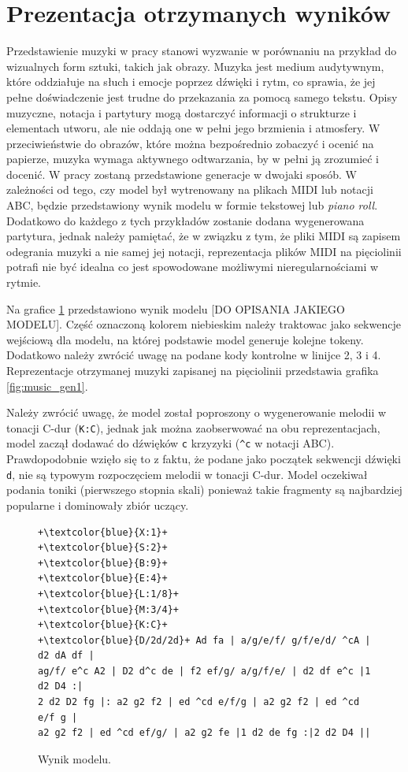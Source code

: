 \documentclass[data-science]{agh-wi} %
\begin{document}
\section{Prezentacja otrzymanych wyników}
Przedstawienie muzyki w pracy stanowi wyzwanie w porównaniu na przykład do wizualnych form sztuki, takich jak obrazy. Muzyka jest medium audytywnym, które oddziałuje na słuch i emocje poprzez dźwięki i rytm, co sprawia, że jej pełne doświadczenie jest trudne do przekazania za pomocą samego tekstu. Opisy muzyczne, notacja i partytury mogą dostarczyć informacji o strukturze i elementach utworu, ale nie oddają one w pełni jego brzmienia i atmosfery. W przeciwieństwie do obrazów, które można bezpośrednio zobaczyć i ocenić na papierze, muzyka wymaga aktywnego odtwarzania, by w pełni ją zrozumieć i docenić. W pracy zostaną przedstawione generacje w dwojaki sposób. W zależności od tego, czy model był wytrenowany na plikach MIDI lub notacji ABC, będzie przedstawiony wynik modelu w formie tekstowej lub \textit{piano roll}. Dodatkowo do każdego z tych przykładów zostanie dodana wygenerowana partytura, jednak należy pamiętać, że w związku z tym, że pliki MIDI są zapisem odegrania muzyki a nie samej jej notacji, reprezentacja plików MIDI na pięciolinii potrafi nie być idealna co jest spowodowane możliwymi nieregularnościami w rytmie.

Na grafice \ref*{code:music_gen1} przedstawiono wynik modelu [DO OPISANIA JAKIEGO MODELU]. Część oznaczoną kolorem niebieskim należy traktowac jako sekwencje wejściową dla modelu, na której podstawie model generuje kolejne tokeny. Dodatkowo należy zwrócić uwagę na podane kody kontrolne w linijce 2, 3 i 4. Reprezentacje otrzymanej muzyki zapisanej na pięciolinii przedstawia grafika \ref*{fig:music_gen1}.

Należy zwrócić uwagę, że model został poproszony o wygenerowanie melodii w tonacji C-dur (\texttt{K:C}), jednak jak można zaobserwować na obu reprezentacjach, model zaczął dodawać do dźwięków \texttt{c} krzyzyki (\texttt{\string^c} w notacji ABC). Prawdopodobnie wzięło się to z faktu, że podane jako początek sekwencji dźwięki \texttt{d}, nie są typowym rozpoczęciem melodii w tonacji C-dur. Model oczekiwał podania toniki (pierwszego stopnia skali) ponieważ takie fragmenty są najbardziej popularne i dominowały zbiór uczący.

\begin{figure}
    \begin{verbatim}
+\textcolor{blue}{X:1}+
+\textcolor{blue}{S:2}+
+\textcolor{blue}{B:9}+
+\textcolor{blue}{E:4}+
+\textcolor{blue}{L:1/8}+
+\textcolor{blue}{M:3/4}+
+\textcolor{blue}{K:C}+
+\textcolor{blue}{D/2d/2d}+ Ad fa | a/g/e/f/ g/f/e/d/ ^cA | d2 dA df |
ag/f/ e^c A2 | D2 d^c de | f2 ef/g/ a/g/f/e/ | d2 df e^c |1 d2 D4 :|
2 d2 D2 fg |: a2 g2 f2 | ed ^cd e/f/g | a2 g2 f2 | ed ^cd e/f g |
a2 g2 f2 | ed ^cd ef/g/ | a2 g2 fe |1 d2 de fg :|2 d2 D4 ||
    \end{verbatim}
    \caption{Wynik modelu.}\label{code:music_gen1}
\end{figure}
\end{document}
